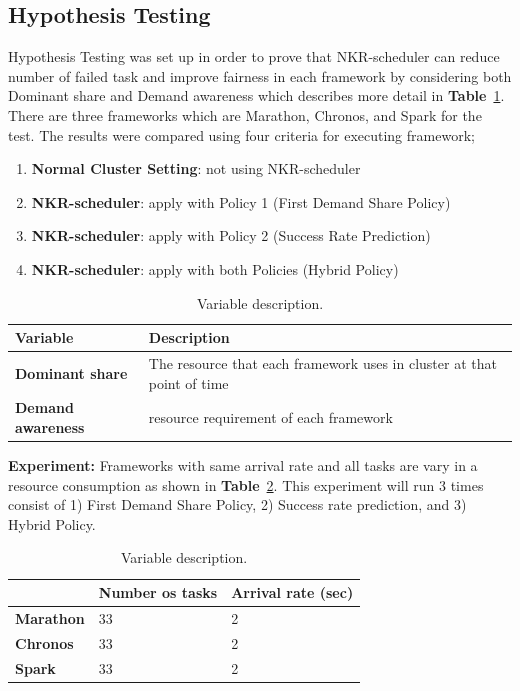 \documentclass[12pt,oneside,openright,a4paper]{cpe-english-project}
\begin{document}
\subsection{Hypothesis Testing} 

\hspace{10mm}Hypothesis Testing was set up in order to prove that NKR-scheduler can reduce number of failed task and improve fairness in each framework by considering both Dominant share and Demand awareness which describes more detail in \textbf{Table}~\ref{tbl:VariableDescription}. There are three frameworks which are Marathon, Chronos, and Spark for the test. The results were compared using four criteria for executing framework;

\begin{enumerate}
  \item \textbf{Normal Cluster Setting}: not using NKR-scheduler 
  \item \textbf{NKR-scheduler}: apply with Policy 1 (First Demand Share Policy)
  \item \textbf{NKR-scheduler}: apply with Policy 2 (Success Rate Prediction)
  \item \textbf{NKR-scheduler}: apply with both Policies (Hybrid Policy)
\end{enumerate}

\begin{table}[!h]
  \caption{Variable description.}\label{tbl:VariableDescription}
  \begin{tabular}{@{}|p{}|p{}|}
      \hline
      \textbf{Variable} & \textbf{Description}\\
      \hline
      \textbf{Dominant share} & The resource that each framework uses in cluster at that point of time\\
      \hline
      \textbf{Demand awareness} & resource requirement of each framework \\
      \hline
  \end{tabular}
\end{table}

\textbf{Experiment:} Frameworks with same arrival rate and all tasks are vary in a resource consumption as shown in \textbf{Table}~\ref{tbl:Experiment}. This experiment will run 3 times consist of 1) First Demand Share Policy, 2) Success rate prediction, and 3) Hybrid Policy.

\begin{table}[!h]
  \caption{Variable description.}\label{tbl:Experiment}
  \begin{tabular}{@{}|p{}|p{}|p{}|}
    \hline
    & \textbf{Number os tasks} & \textbf{Arrival rate (sec)}\\
    \hline
    \textbf{Marathon} & 33 & 2\\
    \hline
    \textbf{Chronos} & 33 & 2 \\
    \hline
    \textbf{Spark} & 33 & 2 \\
    \hline
\end{tabular}
\end{table}
\end{document}
